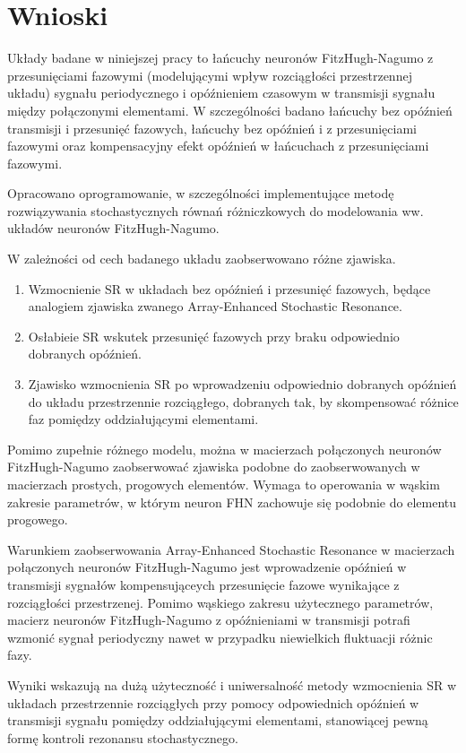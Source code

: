 \section{Wnioski}

Układy badane w niniejszej pracy to łańcuchy neuronów FitzHugh-Nagumo z przesunięciami fazowymi (modelującymi wpływ rozciągłości przestrzennej układu) sygnału periodycznego i opóźnieniem czasowym w transmisji sygnału między połączonymi elementami. W szczególności badano łańcuchy bez opóźnień transmisji i przesunięć fazowych, łańcuchy bez opóźnień i z przesunięciami fazowymi oraz kompensacyjny efekt opóźnień w łańcuchach z przesunięciami fazowymi.

Opracowano oprogramowanie, w szczególności implementujące metodę rozwiązywania stochastycznych równań różniczkowych do modelowania ww. układów neuronów FitzHugh-Nagumo.

W zależności od cech badanego układu zaobserwowano różne zjawiska.
\begin{enumerate}
  \item Wzmocnienie SR w układach bez opóźnień i przesunięć fazowych, będące analogiem zjawiska zwanego Array-Enhanced Stochastic Resonance.
  \item Osłabieie SR wskutek przesunięć fazowych przy braku odpowiednio dobranych opóźnień.
  \item Zjawisko wzmocnienia SR po wprowadzeniu odpowiednio dobranych opóźnień do układu przestrzennie rozciągłego, dobranych tak, by skompensować różnice faz pomiędzy oddziałującymi elementami.
\end{enumerate}
  
Pomimo zupełnie różnego modelu, można w macierzach połączonych neuronów FitzHugh-Nagumo zaobserwować zjawiska podobne do zaobserwowanych w macierzach prostych, progowych elementów. Wymaga to operowania w wąskim zakresie parametrów, w którym neuron FHN zachowuje się podobnie do elementu progowego.

Warunkiem zaobserwowania Array-Enhanced Stochastic Resonance w macierzach połączonych neuronów FitzHugh-Nagumo jest wprowadzenie opóźnień w transmisji sygnałów kompensująceych przesunięcie fazowe wynikające z rozciągłości przestrzenej. Pomimo wąskiego zakresu użytecznego parametrów, macierz neuronów FitzHugh-Nagumo z opóźnieniami w transmisji potrafi wzmonić sygnał periodyczny nawet w przypadku niewielkich fluktuacji różnic fazy.

Wyniki wskazują na dużą użyteczność i uniwersalność metody wzmocnienia SR w układach przestrzennie rozciągłych przy pomocy odpowiednich opóźnień w transmisji sygnału pomiędzy oddziałującymi elementami, stanowiącej pewną formę kontroli rezonansu stochastycznego.